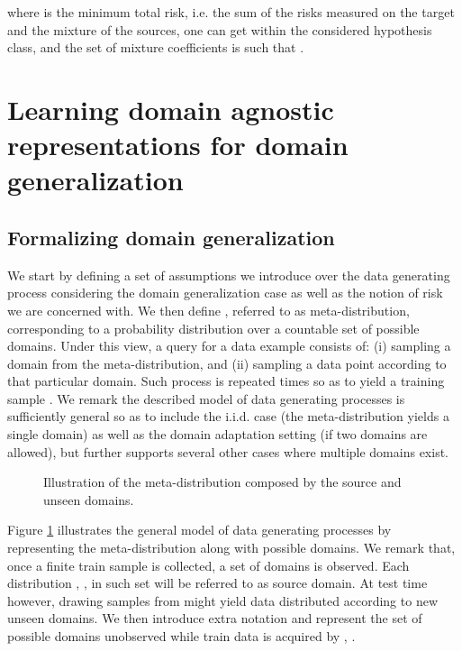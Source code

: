 \documentclass{article}
\begin{document}
where  is the minimum total risk, i.e. the sum of the risks measured on the target and the mixture of the sources, one can get within the considered hypothesis class, and the set  of mixture coefficients is such that .

\section{Learning domain agnostic representations for domain generalization}\label{sec:method}



\subsection{Formalizing domain generalization}

We start by defining a set of assumptions we introduce over the data generating process considering the domain generalization case as well as the notion of risk we are concerned with. We then define , referred to as meta-distribution, corresponding to a probability distribution over a countable set of possible domains. Under this view, a query for a data example consists of: (i) sampling a domain from the meta-distribution, and (ii) sampling a data point according to that particular domain. Such process is repeated  times so as to yield a training sample . We remark the described model of data generating processes is sufficiently general so as to include the i.i.d. case (the meta-distribution yields a single domain) as well as the domain adaptation setting (if two domains are allowed), but further supports several other cases where multiple domains exist.

\begin{figure}[h]
\centering
{}
\caption{Illustration of the meta-distribution  composed by the source and unseen domains.}
\label{fig:meta_dist}
\end{figure}
\noindent Figure \ref{fig:meta_dist} illustrates the general model of data generating processes by representing the meta-distribution along with possible domains. We remark that, once a finite train sample is collected, a set of  domains is observed. Each distribution , , in such set will be referred to as source domain. At test time however, drawing samples from  might yield data distributed according to new unseen domains. We then introduce extra notation and represent the set of possible domains unobserved while train data is acquired by , . 
\end{document}
